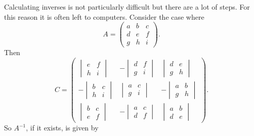 Calculating inverses is not particularly difficult but there are a lot of steps.
For this reason it is often left to computers.
Consider the case where
\[
A = 
\begin{pmatrix}
    a & b & c\\
    d & e & f\\
    g & h & i
\end{pmatrix}
.
\]
Then
\[
C = 
\begin{pmatrix}
    \begin{vmatrix}
        e & f\\
        h & i
    \end{vmatrix}
    & -
    \begin{vmatrix}
        d & f\\
        g & i
    \end{vmatrix}
    &
    \begin{vmatrix}
        d & e\\
        g & h
    \end{vmatrix}
    \\
    -
    \begin{vmatrix}
        b & c\\
        h & i
    \end{vmatrix}
    &
    \begin{vmatrix}
        a & c\\
        g & i
    \end{vmatrix}
    &
    -
    \begin{vmatrix}
        a & b\\
        g & h
    \end{vmatrix}
    \\
    \begin{vmatrix}
        b & c\\
        e & f
    \end{vmatrix}
    &
    -
    \begin{vmatrix}
        a & c\\
        d & f
    \end{vmatrix}
    &
    \begin{vmatrix}
        a & b\\
        d & e
    \end{vmatrix}
\end{pmatrix}
.
\]
So \(A^{-1}\), if it exists, is given by

